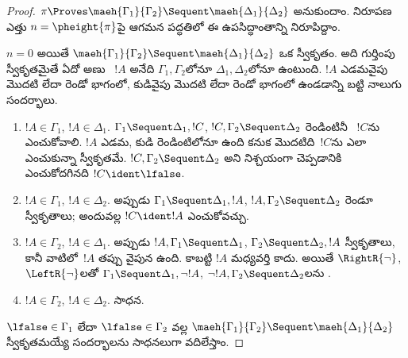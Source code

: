 \documentclass[../../../include/open-logic-section]{subfiles}
\begin{document}
\begin{proof}
  $\pi \Proves \maeh{\Gamma_1}{\Gamma_2} \Sequent
  \maeh{\Delta_1}{\Delta_2}$ అనుకుందాం. నిరూపణ ఎత్తు $n=\pheight{\pi}$పై ఆగమన పద్ధతిలో ఈ ఉపసిద్ధాంతాన్ని నిరూపిద్దాం.

  $n=0$ అయితే $\maeh{\Gamma_1}{\Gamma_2} \Sequent
  \maeh{\Delta_1}{\Delta_2}$ ఒక స్వీకృతం. అది గుర్తింపు స్వీకృతమైతే ఏదో అణు ~$!A$ అనేది $\Gamma_1, \Gamma_2$లోనూ $\Delta_1,
  \Delta_2$లోనూ ఉంటుంది. $!A$ ఎడమవైపు మొదటి లేదా రెండో భాగంలో, కుడివైపు మొదటి లేదా రెండో భాగంలో ఉండడాన్ని బట్టి నాలుగు సందర్భాలు.
  \begin{enumerate}
    \item $!A \in \Gamma_1$, $!A \in \Delta_1$. $\Gamma_1 \Sequent \Delta_1, !C$, $!C, \Gamma_2
    \Sequent \Delta_2$ రెండింటినీ ~$!C$ను ఎంచుకోవాలి. $!A$ ఎడమ, కుడి రెండింటిలోనూ ఉంది కనుక మొదటిది~$!C$ను ఎలా ఎంచుకున్నా స్వీకృతమే. $!C, \Gamma_2 \Sequent \Delta_2$  అని నిశ్చయంగా చెప్పడానికి ఎంచుకోదగినది $!C \ident \lfalse$.
    \item $!A \in \Gamma_1$, $!A \in \Delta_2$. అప్పుడు $\Gamma_1
    \Sequent \Delta_1, !A$, $!A, \Gamma_2 \Sequent \Delta_2$ రెండూ స్వీకృతాలు; అందువల్ల $!C \ident !A$ ఎంచుకోవచ్చు.
    \item $!A \in \Gamma_2$, $!A \in \Delta_1$. అప్పుడు $!A, \Gamma_1
    \Sequent \Delta_1$, $\Gamma_2 \Sequent \Delta_2, !A$ స్వీకృతాలు, కానీ వాటిలో~$!A$ తప్పు వైపున ఉంది. కాబట్టి $!A$ మధ్యవర్తి కాదు. అయితే $\RightR{\lnot}$, $\LeftR{\lnot}$లతో $\Gamma_1
    \Sequent \Delta_1, \lnot!A$, $\lnot !A, \Gamma_2 \Sequent
    \Delta_2$లను .
    \item $!A \in \Gamma_2$, $!A \in \Delta_2$. సాధన.
  \end{enumerate}
  $\lfalse \in \Gamma_1$ లేదా $\lfalse \in \Gamma_2$ వల్ల $\maeh{\Gamma_1}{\Gamma_2} \Sequent
  \maeh{\Delta_1}{\Delta_2}$ స్వీకృతమయ్యే సందర్భాలను సాధనలుగా వదిలేస్తాం.


\end{proof}
\end{document}
